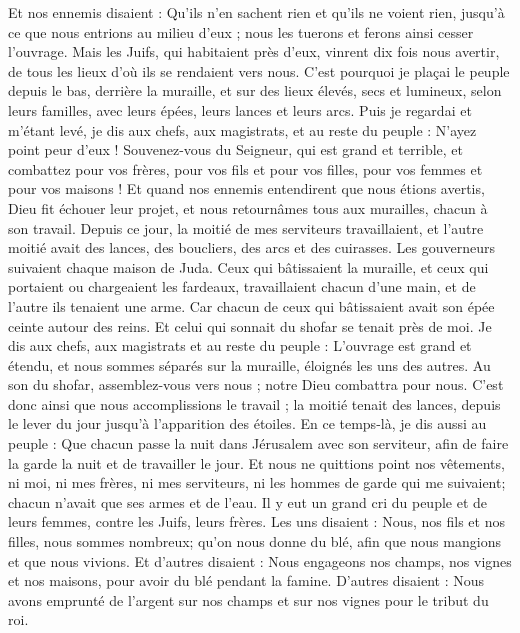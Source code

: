 \begin{multicols}{2}
Et nos ennemis disaient : Qu'ils n'en sachent rien et qu'ils ne voient rien, jusqu'à ce que nous entrions au milieu d'eux ; nous les tuerons et ferons ainsi cesser l'ouvrage.
Mais les Juifs, qui habitaient près d’eux, vinrent dix fois nous avertir, de tous les lieux d'où ils se rendaient vers nous.
C'est pourquoi je plaçai le peuple depuis le bas, derrière la muraille, et sur des lieux élevés, secs et lumineux, selon leurs familles, avec leurs épées, leurs lances et leurs arcs.
Puis je regardai et m’étant levé, je dis aux chefs, aux magistrats, et au reste du peuple : N'ayez point peur d'eux ! Souvenez-vous du Seigneur, qui est grand et terrible, et combattez pour vos frères, pour vos fils et pour vos filles, pour vos femmes et pour vos maisons !
Et quand nos ennemis entendirent que nous étions avertis, Dieu fit échouer leur projet, et nous retournâmes tous aux murailles, chacun à son travail.
Depuis ce jour, la moitié de mes serviteurs travaillaient, et l'autre moitié avait des lances, des boucliers, des arcs et des cuirasses. Les gouverneurs suivaient chaque maison de Juda.
Ceux qui bâtissaient la muraille, et ceux qui portaient ou chargeaient les fardeaux, travaillaient chacun d'une main, et de l'autre ils tenaient une arme.
Car chacun de ceux qui bâtissaient avait son épée ceinte autour des reins. Et celui qui sonnait du shofar se tenait près de moi.
Je dis aux chefs, aux magistrats et au reste du peuple : L'ouvrage est grand et étendu, et nous sommes séparés sur la muraille, éloignés les uns des autres.
Au son du shofar, assemblez-vous vers nous ; notre Dieu combattra pour nous.
C'est donc ainsi que nous accomplissions le travail ; la moitié tenait des lances, depuis le lever du jour jusqu'à l’apparition des étoiles.
En ce temps-là, je dis aussi au peuple : Que chacun passe la nuit dans Jérusalem avec son serviteur, afin de faire la garde la nuit et de travailler le jour.
Et nous ne quittions point nos vêtements, ni moi, ni mes frères, ni mes serviteurs, ni les hommes de garde qui me suivaient; chacun n'avait que ses armes et de l'eau.
\VerseOne{}Il y eut un grand cri du peuple et de leurs femmes, contre les Juifs, leurs frères.
Les uns disaient : Nous, nos fils et nos filles, nous sommes nombreux; qu'on nous donne du blé, afin que nous mangions et que nous vivions.
Et d’autres disaient : Nous engageons nos champs, nos vignes et nos maisons, pour avoir du blé pendant la famine.
D’autres disaient : Nous avons emprunté de l'argent sur nos champs et sur nos vignes pour le tribut du roi.

\end{multicols}

